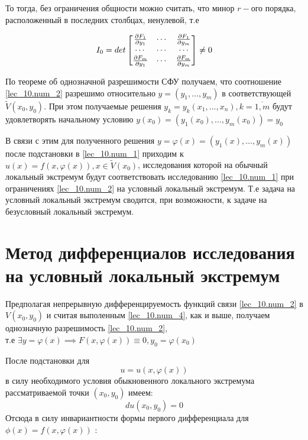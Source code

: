 \documentclass[../../main.tex]{subfiles}
\begin{document}
\begin{example}
То тогда, без ограничения общности можно считать, что минор
$r-$ого порядка, расположенный в последних столбцах, ненулевой, т.е

\begin{equation} \label{lec_10.num_4}
	I_0 = det \begin{bmatrix}
	\frac{\partial F_1}{\partial y_1} & \cdots & \frac{\partial F_1}{\partial y_m} \\
	\cdots & \cdots & \cdots \\
	\frac{\partial F_m}{\partial y_1} & \cdots & \frac{\partial F_m}{\partial y_m}
	\end{bmatrix} \ne 0
\end{equation}

По теореме об однозначной разрешимости СФУ получаем, что 
соотношение \ref{lec_10.num_2} разрешимо относительно $y = \left( 
y_1, \ldots, y_m \right) $ в соответствующей $\widetilde{V} (x_0, y_0)$.
При этом получаемые решения $y_k = y_k \left( x_1, \ldots, x_n 
\right), k = \overline{1, m}$ будут удовлетворять начальному условию
$y(x_0) = \left( y_1(x_0), \ldots, y_m(x_0) \right) = y_0$

В связи с этим для полученного решения $y = \varphi(x) = \left( 
y_1(x), \ldots, y_m(x) \right)$ после подстановки в \ref{lec_10.num_1} 
приходим к $u(x) = f\left( x, \varphi(x) \right), x \in \widetilde{V}(x_0)$, 
исследования которой на обычный локальный экстремум будут 
соответствовать исследованию \ref{lec_10.num_1} 
при ограничениях \ref{lec_10.num_2} на условный локальный экстремум.
Т.е задача на условный локальный экстремум сводится, при возможности, 
к задаче на безусловный 
локальный экстремум.
\end{example}

\section{Метод дифференциалов исследования на условный локальный экстремум}

Предполагая непрерывную дифференцируемость функций связи \ref{lec_10.num_2} 
в $V(x_0, y_0)$ и считая выполенным \ref{lec_10.num_4}, как и выше,
получаем однозначную разрешимость \ref{lec_10.num_2}, \\ т.е
$\exists y = \varphi(x) \implies F\left( x, \varphi(x) \right) \equiv 0, 
y_0 = \varphi(x_0)$

После подстановки для
\begin{equation} \label{lec_10.num_5}
	u = u\left( x, \varphi(x) \right)
\end{equation}
в силу необходимого условия обыкновенного локального экстремума 
рассматриваемой точки $(x_0, y_0)$ имеем:
\[ du(x_0, y_0) = 0 \]
Отсюда в силу инвариантности формы первого дифференциала для 
$\phi(x) = f\left( x, \varphi(x) \right)$ :
\end{document}
